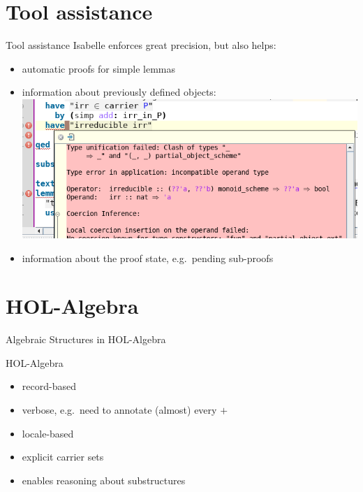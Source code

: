 \documentclass[%
	sans,
	12pt,
]{beamer}
\newcommand{\high}[1]{{\usebeamercolor[fg]{structure} #1}}
\begin{document}
\section{Tool assistance}
\begin{frame}{Tool assistance}%
Isabelle enforces great precision, but also helps:
\begin{itemize}
	\item automatic proofs for simple lemmas\pause %
	\item information about previously defined objects: \pause
	\includegraphics[width=0.7\linewidth]{"type_error"} \pause
	\item information about the proof state, e.g.\ pending sub-proofs
\end{itemize}
\end{frame}

\section{HOL-Algebra}
\begin{frame}
\begin{center}
\huge\high{Algebraic Structures in HOL-Algebra}%
\end{center}
\end{frame}

\begin{frame}{HOL-Algebra}
\begin{itemize}
	\item record-based \pause%
	\item verbose, e.g.\ need to annotate (almost) every $+$ \pause %
	\item locale-based \pause%
	\item explicit carrier sets \pause
	\item enables reasoning about substructures	%
\end{itemize}
\end{frame}
\end{document}
